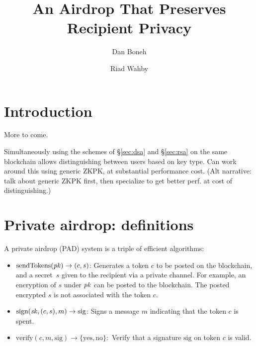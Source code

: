 \documentclass[11pt]{article}
\begin{document}
\title{An Airdrop That Preserves Recipient Privacy}
\author{Dan Boneh \and Riad Wahby}

\maketitle

\begin{abstract}
\end{abstract}

\section{Introduction}

More to come.

Simultaneously using the schemes of \S\ref{sec:dsa} and \S\ref{sec:rsa}
    on the same blockchain allows distinguishing between users based on
    key type.
Can work around this using generic ZKPK, at substantial performance cost.
(Alt narrative: talk about generic ZKPK first, then specialize to get better
    perf. at cost of distinguishing.)

\section{Private airdrop: definitions}\label{sec:defs}


A private airdrop (PAD) system is a triple of efficient algorithms:
\begin{itemize}
\item $\text{sendTokens}(\mathit{pk}) \to (c, s)$:
Generates a token $c$ to be posted on the blockchain,
and a secret~$s$ given to the recipient via a private channel.
For example, an encryption of $s$ under $\mathit{pk}$ can be posted
to the blockchain.   The posted encrypted $s$ is not associated with 
the token $c$. 

\item $\text{sign}(\mathit{sk}, (c, s), m) \to \text{sig}$:
Signs a message $m$ indicating that the token $c$ is spent.

\item $\text{verify}(c, m, \text{sig}) \to \{\text{yes},\text{no}\}:$
Verify that a signature $\text{sig}$ on token $c$ is valid.
\end{itemize}
\end{document}
